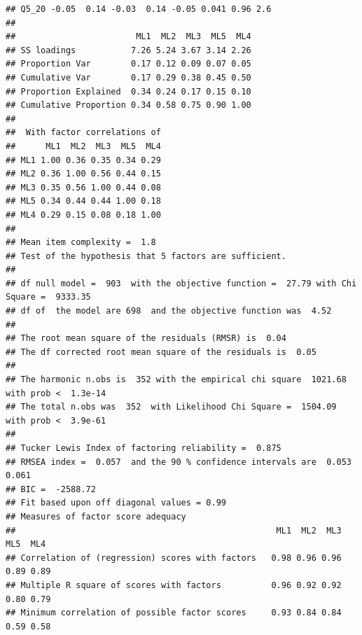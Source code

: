 \documentclass[
  man]{apa6}
\begin{document}
\begin{verbatim}
## Q5_20 -0.05  0.14 -0.03  0.14 -0.05 0.041 0.96 2.6
## 
##                        ML1  ML2  ML3  ML5  ML4
## SS loadings           7.26 5.24 3.67 3.14 2.26
## Proportion Var        0.17 0.12 0.09 0.07 0.05
## Cumulative Var        0.17 0.29 0.38 0.45 0.50
## Proportion Explained  0.34 0.24 0.17 0.15 0.10
## Cumulative Proportion 0.34 0.58 0.75 0.90 1.00
## 
##  With factor correlations of 
##      ML1  ML2  ML3  ML5  ML4
## ML1 1.00 0.36 0.35 0.34 0.29
## ML2 0.36 1.00 0.56 0.44 0.15
## ML3 0.35 0.56 1.00 0.44 0.08
## ML5 0.34 0.44 0.44 1.00 0.18
## ML4 0.29 0.15 0.08 0.18 1.00
## 
## Mean item complexity =  1.8
## Test of the hypothesis that 5 factors are sufficient.
## 
## df null model =  903  with the objective function =  27.79 with Chi Square =  9333.35
## df of  the model are 698  and the objective function was  4.52 
## 
## The root mean square of the residuals (RMSR) is  0.04 
## The df corrected root mean square of the residuals is  0.05 
## 
## The harmonic n.obs is  352 with the empirical chi square  1021.68  with prob <  1.3e-14 
## The total n.obs was  352  with Likelihood Chi Square =  1504.09  with prob <  3.9e-61 
## 
## Tucker Lewis Index of factoring reliability =  0.875
## RMSEA index =  0.057  and the 90 % confidence intervals are  0.053 0.061
## BIC =  -2588.72
## Fit based upon off diagonal values = 0.99
## Measures of factor score adequacy             
##                                                    ML1  ML2  ML3  ML5  ML4
## Correlation of (regression) scores with factors   0.98 0.96 0.96 0.89 0.89
## Multiple R square of scores with factors          0.96 0.92 0.92 0.80 0.79
## Minimum correlation of possible factor scores     0.93 0.84 0.84 0.59 0.58
\end{verbatim}
\end{document}
